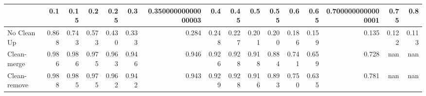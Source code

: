 \begin{tabular}{lrrrrrrrrrrrrrrr}
\toprule
{} &   0.1 &  0.15 &   0.2 &  0.25 &   0.3 & 0.35000000000000003 &   0.4 &  0.45 &   0.5 &  0.55 &   0.6 &  0.65 & 0.7000000000000001 &  0.75 &   0.8 \\
\midrule
No Clean Up  & 0.868 & 0.743 & 0.573 & 0.430 & 0.333 &               0.284 & 0.248 & 0.227 & 0.201 & 0.200 & 0.186 & 0.159 &              0.135 & 0.122 & 0.113 \\
Clean-merge  & 0.986 & 0.986 & 0.975 & 0.963 & 0.946 &               0.946 & 0.926 & 0.928 & 0.918 & 0.884 & 0.741 & 0.659 &              0.728 &   nan &   nan \\
Clean-remove & 0.988 & 0.985 & 0.975 & 0.962 & 0.942 &               0.943 & 0.929 & 0.928 & 0.916 & 0.893 & 0.750 & 0.635 &              0.781 &   nan &   nan \\
\bottomrule
\end{tabular}
